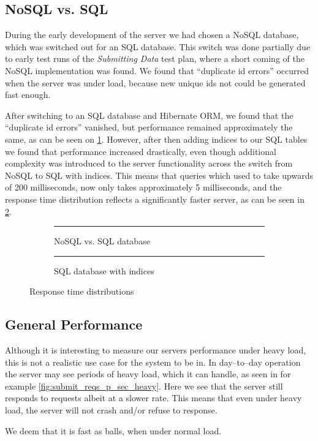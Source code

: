 \subsection{NoSQL vs. SQL}\label{subsec:nosql_vs._sql}
During the early development of the server we had chosen a NoSQL database, which was switched out for an SQL database.
This switch was done partially due to early test runs of the \textit{Submitting Data} test plan, where a short coming of the NoSQL implementation was found.
We found that \enquote{duplicate id errors} occurred when the server was under load, because new unique ids not could be generated fast enough.

After switching to an SQL database and Hibernate ORM, we found that the \enquote{duplicate id errors} vanished, but performance remained approximately the same, as can be seen on \cref{fig:same_response_sql}.
However, after then adding indices to our SQL tables we found that performance increased drastically, even though additional complexity was introduced to the server functionality across the switch from NoSQL to SQL with indices.
This means that queries which used to take upwards of 200 milliseconds, now only takes approximately 5 milliseconds, and the response time distribution reflects a significantly faster server, as can be seen in \cref{fig:fast_response_indices}.

\begin{figure}[!htb]
    \centering
    \begin{subfigure}[b]{0.5\textwidth}
        \centering
        \rule{5cm}{5cm}
        \caption{NoSQL vs. SQL database}\label{fig:same_response_sql}
    \end{subfigure}\hfill%
    \begin{subfigure}[b]{0.5\textwidth}
        \centering
        \rule{5cm}{5cm}
        \caption{SQL database with indices}\label{fig:fast_response_indices}
    \end{subfigure}
    \caption{Response time distributions}\label{fig:nosql_vs_sql}
\end{figure}

\subsection{General Performance}
Although it is interesting to measure our servers performance under heavy load, this is not a realistic use case for the system to be in.
In day--to--day operation the server may see periods of heavy load, which it can handle, as seen in for example \cref{fig:submit_reqs_p_sec_heavy}.
Here we see that the server still responds to requests albeit at a slower rate.
This means that even under heavy load, the server will not crash and/or refuse to response.

We deem that it is fast as balls, when under normal load.
